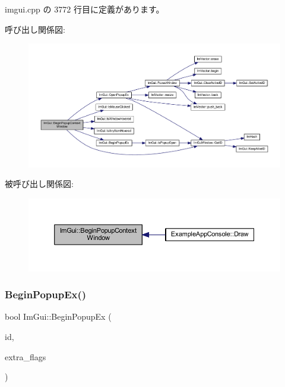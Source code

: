  imgui.\+cpp の 3772 行目に定義があります。

呼び出し関係図\+:\nopagebreak
\begin{figure}[H]
\begin{center}
\leavevmode
\includegraphics[width=350pt]{namespace_im_gui_acf98c99f041ea341d0328e071c56411b_cgraph}
\end{center}
\end{figure}
被呼び出し関係図\+:\nopagebreak
\begin{figure}[H]
\begin{center}
\leavevmode
\includegraphics[width=350pt]{namespace_im_gui_acf98c99f041ea341d0328e071c56411b_icgraph}
\end{center}
\end{figure}
\mbox{\label{namespace_im_gui_a89da3a22300e8293257b6cfdf1b83b7a}} 
\subsubsection{\texorpdfstring{Begin\+Popup\+Ex()}{BeginPopupEx()}}
{\footnotesize\ttfamily bool Im\+Gui\+::\+Begin\+Popup\+Ex (\begin{DoxyParamCaption}\item[{\mbox{\hyperlink{imgui_8h_a1785c9b6f4e16406764a85f32582236f}{Im\+Gui\+ID}}}]{id,  }\item[{\mbox{\hyperlink{imgui_8h_a0b8e067ab4f7a818828c8d89e531addc}{Im\+Gui\+Window\+Flags}}}]{extra\+\_\+flags }\end{DoxyParamCaption})}



